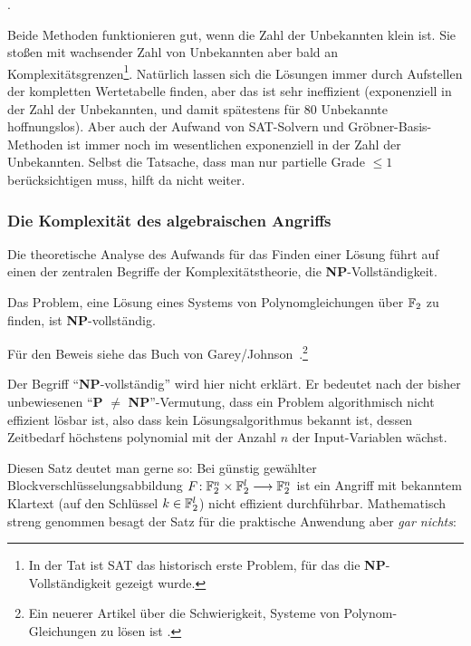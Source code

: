 \begin{refsegment}
\begin{itemize}
{      }.
\end{itemize}
Beide Methoden funktionieren gut, wenn die Zahl der Unbekannten klein
ist. Sie stoßen mit wachsender Zahl von Unbekannten aber bald an
Komplexitätsgrenzen\footnote{%
  In der Tat ist SAT das historisch erste Problem, für das die
  \textbf{NP}-Vollständigkeit gezeigt wurde.
}.
Natürlich lassen sich die Lösungen immer durch Aufstellen der kompletten
Wertetabelle finden, aber das ist sehr ineffizient (exponenziell
in der Zahl der Unbekannten, und damit spätestens für 80 Unbekannte hoffnungslos).
Aber auch der Aufwand von SAT-Solvern und Gröbner-Basis-Methoden ist
immer noch im wesentlichen exponenziell in der Zahl der Unbekannten.
Selbst die Tatsache, dass man nur partielle Grade
$\leq 1$ berücksichtigen muss, hilft da nicht weiter.

\subsubsection*{Die Komplexität des algebraischen Angriffs}

Die theoretische Analyse des Aufwands für das Finden einer Lösung führt
auf einen der zentralen Begriffe der Komplexitätstheorie, die
\textbf{NP}-Vollständigkeit.

\begin{satz}
  Das Problem, eine Lösung eines Systems von Polynomgleichungen über $\mathbb{F}_2$
  zu finden, ist \textbf{NP}-vollständig.
\end{satz}
Für den Beweis siehe das Buch von Garey/Johnson~\cite{GaJo1979}.\footnote{%
   Ein neuerer Artikel über die Schwierigkeit, Systeme von Polynom-Gleichungen zu lösen
   ist \cite{CGHM2003}.
}

Der Begriff "`\textbf{NP}-vollständig"' wird hier nicht erklärt.
Er bedeutet nach der bisher unbewiesenen "`\textbf{P} $\neq$ \textbf{NP}"'-Vermutung,
dass ein Problem algorithmisch nicht effizient lösbar ist, also dass kein
Lösungsalgorithmus bekannt ist, dessen Zeitbedarf höchstens polynomial
mit der Anzahl $n$ der Input-Variablen wächst.

Diesen Satz deutet man gerne so: Bei günstig gewählter Blockverschlüsselungsabbildung
\mbox{$F\!: \mathbb{F}_2^n \times \mathbb{F}_2^l \longrightarrow \mathbb{F}_2^n$} ist ein Angriff mit
bekanntem Klartext
(auf den Schlüssel $k \in \mathbb{F}_2^l$) nicht effizient durchführbar. Mathematisch streng
genommen besagt der Satz für die praktische Anwendung aber {\em gar nichts}:


\end{refsegment}
